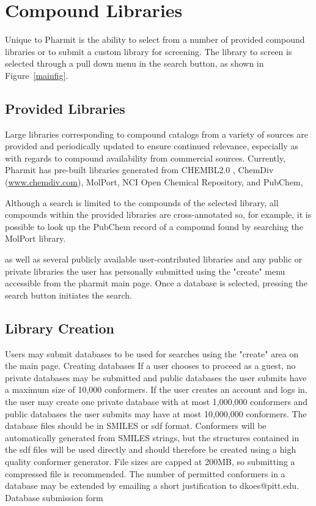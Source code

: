 \section{Compound Libraries}

Unique to Pharmit is the ability to select from a number of provided compound libraries or to submit a custom library for screening.  The library to screen is selected through a pull down menu in the search button, as shown in Figure~\ref{mainfig}.  

\subsection{Provided Libraries}

Large libraries corresponding to compound catalogs from a variety of sources are provided and periodically updated to ensure continued relevance, especially as with regards to compound availability from commercial sources.  Currently, Pharmit has pre-built libraries generated from CHEMBL2.0 \cite{Gaulton_2011}, ChemDiv (\url{www.chemdiv.com}), MolPort, NCI Open Chemical Repository, and PubChem, 
 
 
 Although a search is limited to the compounds of the selected library, all compounds within the provided libraries are cross-annotated so, for example, it is possible to look up the PubChem record of a compound found by searching the MolPort library.
 
 as well as several publicly available user-contributed libraries and any public or private libraries the user has personally submitted using the "create" menu accessible from the pharmit main page. Once a database is selected, pressing the search button initiates the search. 

\subsection{Library Creation}
Users may submit databases to be used for searches using the "create" area on the main page. Creating databases
If a user chooses to proceed as a guest, no private databases may be submitted and public databases the user submits have a maximum size of 10,000 conformers. If the user creates an account and logs in, the user may create one private database with at most 1,000,000 conformers and public databases the user submits may have at most 10,000,000 conformers. The database files should be in SMILES or sdf format. Conformers will be automatically generated from SMILES strings, but the structures contained in the sdf files will be used directly and should therefore be created using a high quality conformer generator. File sizes are capped at 200MB, so submitting a compressed file is recommended. The number of permitted conformers in a database may be extended by emailing a short justification to dkoes@pitt.edu. 
Database submission form